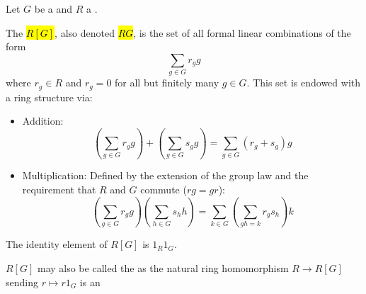 \begin{definition} \label{definition:group_ring_of_a_group_over_a_ring}
Let $G$ be a  and $R$ a .

The  \hl{$R[G]$}, also denoted \hl{$RG$}, is the set of all formal linear combinations of the form
$$ \sum_{g \in G} r_g g $$
where $r_g \in R$ and $r_g = 0$ for all but finitely many $g \in G$. This set is endowed with a ring structure via:
\begin{itemize}
    \item Addition:
    $$ \left( \sum_{g \in G} r_g g \right) + \left( \sum_{g \in G} s_g g \right) = \sum_{g \in G} (r_g + s_g) g $$
    \item Multiplication: Defined by the extension of the group law and the requirement that $R$ and $G$ commute ($rg = gr$):
    $$ \left( \sum_{g \in G} r_g g \right) \left( \sum_{h \in G} s_h h \right) = \sum_{k \in G} \left( \sum_{gh=k} r_g s_h \right) k $$
\end{itemize}
The identity element of $R[G]$ is $1_R 1_G$.

$R[G]$ may also be called the  as the natural ring homomorphism $R \to R[G]$ sending $r \mapsto r 1_G$ is an 
\end{definition}